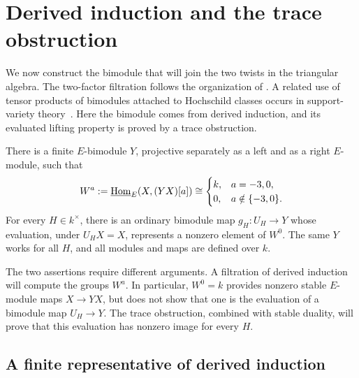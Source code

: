 \section{Derived induction and the trace obstruction}
\label{b:section}

We now construct the bimodule that will join the two twists in the
triangular algebra.  The two-factor filtration follows the organization
of \cite[Section~6]{OpenAIAR2026}. A related use of tensor products of
bimodules attached to Hochschild classes occurs in support-variety
theory~\cite[Definition~2.1 and Theorem~2.3]{ErdmannEtAl2003}.
Here the bimodule comes from derived
induction, and its evaluated lifting property is proved by a trace
obstruction.

\begin{proposition}\label{b:bimodule}
There is a finite \(E\)-bimodule \(Y\), projective separately as a left and
as a right \(E\)-module, such that
\begin{equation}\label{b:W}
 W^a:=\underline{\operatorname{Hom}}_E(X,(YX)[a])
 \cong
 \begin{cases}
 k,&a=-3,0,\\
 0,&a\notin\{-3,0\}.
 \end{cases}
\end{equation}
For every \(H\in k^\times\), there is an ordinary bimodule map
\(g_H:U_H\to Y\) whose evaluation, under \(U_HX=X\), represents a nonzero
element of \(W^0\).  The same \(Y\) works for all \(H\), and all modules and
maps are defined over \(k\).
\end{proposition}

The two assertions require different arguments. A filtration of derived
induction will compute the groups \(W^a\). In particular, \(W^0=k\)
provides nonzero stable \(E\)-module maps \(X\to YX\), but does not show
that one is the evaluation of a bimodule map \(U_H\to Y\). The trace
obstruction, combined with stable duality, will prove that this evaluation
has nonzero image for every \(H\).

\subsection{A finite representative of derived induction}

